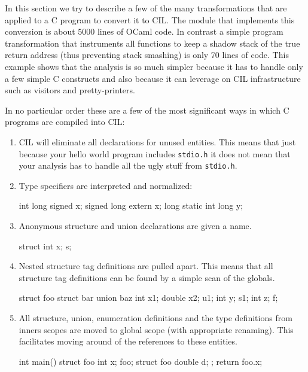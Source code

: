 \documentclass{article}
\def\t#1{{\tt #1}}
\begin{document}
 In this section we try to describe a few of the many transformations that are
applied to a C program to convert it to CIL. The module that implements this
conversion is about 5000 lines of OCaml code. In contrast a simple program
transformation that instruments all functions to keep a shadow stack of the
true return address (thus preventing stack smashing) is only 70 lines of code.
This example shows that the analysis is so much simpler because it has to
handle only a few simple C constructs and also because it can leverage on CIL
infrastructure such as visitors and pretty-printers.

 In no particular order these are a few of the most significant ways in which
C programs are compiled into CIL:
\begin{enumerate}
\item CIL will eliminate all declarations for unused entities. This means that
just because your hello world program includes \t{stdio.h} it does not mean
that your analysis has to handle all the ugly stuff from \t{stdio.h}.

\item Type specifiers are interpreted and normalized:
\begin{cilcode}[global]
int long signed x;
signed long extern x;
long static int long y;
\end{cilcode}

\item Anonymous structure and union declarations are given a name. 
\begin{cilcode}[global]
 struct { int x; } s;
\end{cilcode}

\item Nested structure tag definitions are pulled apart. This means that all
structure tag definitions can be found by a simple scan of the globals.

\begin{cilcode}[global]
struct foo {
   struct bar {
      union baz { 
          int x1; 
          double x2;
      } u1;
      int y;
   } s1;
   int z;
} f;
\end{cilcode}

\item All structure, union, enumeration definitions and the type definitions
from inners scopes are moved to global scope (with appropriate renaming). This
facilitates moving around of the references to these entities.

\begin{cilcode}[global]
int main() {
  struct foo { 
        int x; } foo; 
  {
     struct foo { 
        double d;
     };
     return foo.x;
  }      
}
\end{cilcode}


\end{enumerate}
\end{document}

